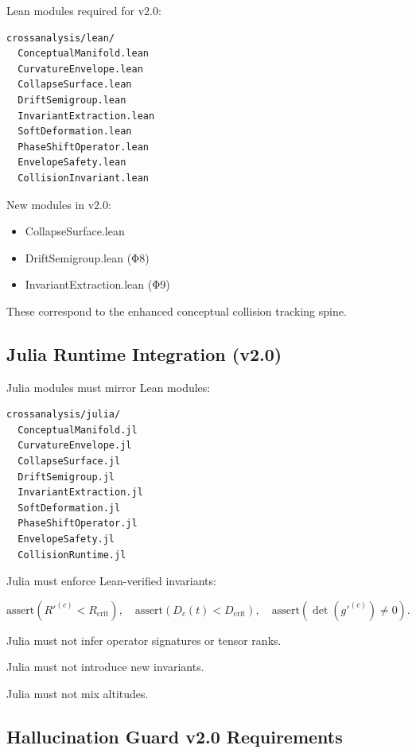 Lean modules required for v2.0:

\begin{verbatim}
crossanalysis/lean/
  ConceptualManifold.lean
  CurvatureEnvelope.lean
  CollapseSurface.lean
  DriftSemigroup.lean
  InvariantExtraction.lean
  SoftDeformation.lean
  PhaseShiftOperator.lean
  EnvelopeSafety.lean
  CollisionInvariant.lean
\end{verbatim}

New modules in v2.0:

\begin{itemize}
  \item CollapseSurface.lean
  \item DriftSemigroup.lean (Φ8)
  \item InvariantExtraction.lean (Φ9)
\end{itemize}

These correspond to the enhanced conceptual collision tracking spine.

\subsection{Julia Runtime Integration (v2.0)}

Julia modules must mirror Lean modules:

\begin{verbatim}
crossanalysis/julia/
  ConceptualManifold.jl
  CurvatureEnvelope.jl
  CollapseSurface.jl
  DriftSemigroup.jl
  InvariantExtraction.jl
  SoftDeformation.jl
  PhaseShiftOperator.jl
  EnvelopeSafety.jl
  CollisionRuntime.jl
\end{verbatim}

Julia must enforce Lean-verified invariants:

\[
\text{assert}(R'^{(c)} < R_{\text{crit}}),\quad
\text{assert}(D_c(t) < D_{\text{crit}}),\quad
\text{assert}(\det(g'^{(c)}) \neq 0).
\]

Julia must not infer operator signatures or tensor ranks.

Julia must not introduce new invariants.

Julia must not mix altitudes.

\subsection{Hallucination Guard v2.0 Requirements}

